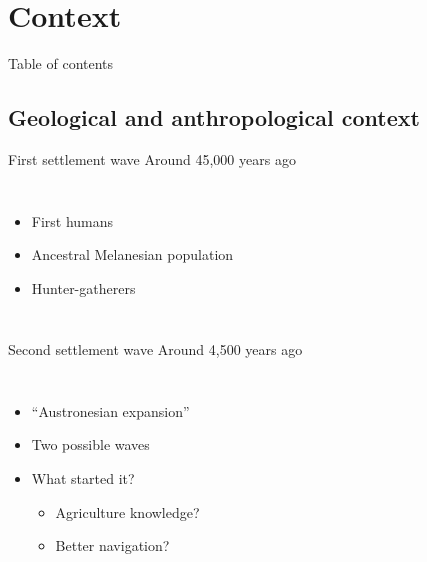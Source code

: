 \documentclass[10pt, aspectratio=43]{beamer}
\begin{document}
\section{Context}
\begin{frame}{}{Table of contents}
\tableofcontents[currentsection, subsectionstyle=show/show/hide]
\end{frame}

\subsection{Geological and anthropological context}

\begin{frame}{}{}
\end{frame}

\addtocounter{framenumber}{-1}
\begin{frame}{}{First settlement wave Around 45,000 years ago}
\begin{columns}

  \color{masseyWhite}
  \begin{itemize}
    \item First humans
    \item Ancestral Melanesian population
    \item Hunter-gatherers
  \end{itemize}
\end{columns}
\end{frame}

\addtocounter{framenumber}{-1}
\begin{frame}{}{Second settlement wave Around 4,500 years ago}
\begin{columns}

  \color{masseyWhite}
  \begin{itemize}
    \item “Austronesian expansion”
    \item Two possible waves
    \item What started it?
    \begin{itemize}
      \item Agriculture knowledge?
      \item Better navigation?
    \end{itemize}
  \end{itemize}
\end{columns}
\end{frame}
\end{document}
